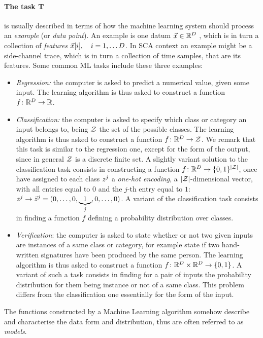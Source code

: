 \paragraph*{The task T} is usually described in terms of how the machine learning system should process an \emph{example} (or \emph{data point}). An example is one datum $\vec{x}\in \mathbb{R}^D$ , which is in turn a collection of \emph{features} $\vec{x}[i], \quad i=1,\dots D$. In SCA context an example might be a side-channel trace, which is in turn a collection of time samples, that are its features. Some common ML tasks include these three examples: 
\begin{itemize}
\item \emph{Regression: } the computer is asked to predict a numerical value, given some input. The learning algorithm is thus asked to construct a function $f\colon \mathbb{R}^D \rightarrow \mathbb{R}$.
\item \emph{Classification: } the computer is asked to specify which class or category an input belongs to, being $\mathcal{Z}$ the set of the possible classes. The learning algorithm is thus asked to construct a function $f\colon \mathbb{R}^D \rightarrow \mathcal{Z}$. We remark that this task is similar to the regression one, except for the form of the output, since in general $\mathcal{Z}$ is a discrete finite set. A slightly variant solution to the classification task consists in constructing a function $f\colon \mathbb{R}^D \rightarrow \{0,1\}^{\lvert\mathcal{Z}\rvert}$, once have assigned to each class $z^j$ a \emph{one-hot encoding}, \ie  a $\lvert\mathcal{Z}\rvert$-dimensional vector,
with all entries equal to $0$ and the $j$-th entry equal to $1$: $z^j
\rightarrow \vec{z}^j = (0,\ldots , 0,\underbrace{1}_{j},0,\dots,0)$. A variant of the classification task consists in finding a function $f$ defining a probability distribution over classes.
\item \emph{Verification}: the computer is asked to state whether or not two given inputs are instances of a same class or category, for example state if two hand-written signatures have been produced by the same person. The learning algorithm is thus asked to construct a function $f\colon \mathbb{R}^D \times \mathbb{R}^{D}\rightarrow \{0,1\}$. A variant of such a task consists in finding for a pair of inputs the probability distribution for them being instance or not of a same class. This problem differs from the classification one essentially for the form of the input.
\end{itemize}
The functions constructed by a Machine Learning algorithm somehow describe and characterise the data form and distribution, thus are often referred to as \emph{models}.

